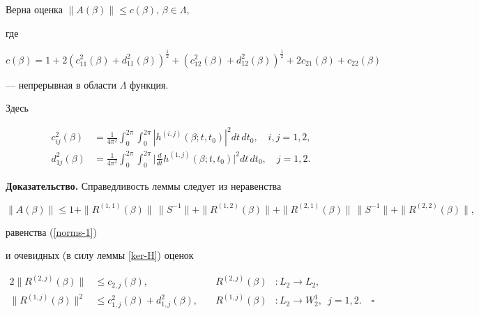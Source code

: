 \begin{lem}


\label{est-A}


Верна оценка $\|A(\beta)\| \le c(\beta)$, $\beta \in \Lambda$,


где 


$$


c(\beta)= 1+2(c_{11}^2(\beta)+d_{11}^2(\beta))^{\frac{1}{2}}+


 (c_{12}^2(\beta)+d_{12}^2(\beta))^{\frac{1}{2}}+


2c_{21}(\beta)+c_{22}(\beta)


$$


--- непрерывная в области $\Lambda$ функция.


Здесь


\begin{align*}


c_{ij}^2(\beta)&=\frac{1}{4\pi^2}


\int_0^{2\pi} \int_0^{2\pi} |h^{(i,j)}(\beta;t,t_0)|^2 dt\,dt_0,


\quad i,j=1,2,\\


d_{1j}^2(\beta)&=\frac{1}{4\pi^2}


\int_0^{2\pi} \int_0^{2\pi} \bigg|\frac{d}{dt}


h^{(1,j)}(\beta;t,t_0)\bigg|^2 dt\,dt_0,


\quad j=1,2.


\end{align*}


\end{lem}





{\bf Доказательство.} Справедливость леммы следует из неравенства


$$


\|A(\beta)\|\le 1+\|R^{(1,1)}(\beta)\|\,\|S^{-1}\|+\|R^{(1,2)}(\beta)\|+


\|R^{(2,1)}(\beta)\|\,\|S^{-1}\|+\|R^{(2,2)}(\beta)\|,


$$


равенства (\ref{norms-1})


и очевидных (в силу леммы \ref{ker-H}) оценок


\begin{alignat*}{2}


\|R^{(2,j)}(\beta)\|&\le c_{2,j}(\beta), &\quad


R^{(2,j)}(\beta)&:L_2\to L_2,\\


\|R^{(1,j)}(\beta)\|^2&\le c_{1,j}^2(\beta)+d_{1,j}^2(\beta),&\quad


R^{(1,j)}(\beta)&:L_2\to W_2^1,\ \;j=1,2.\quad\square


\end{alignat*}






